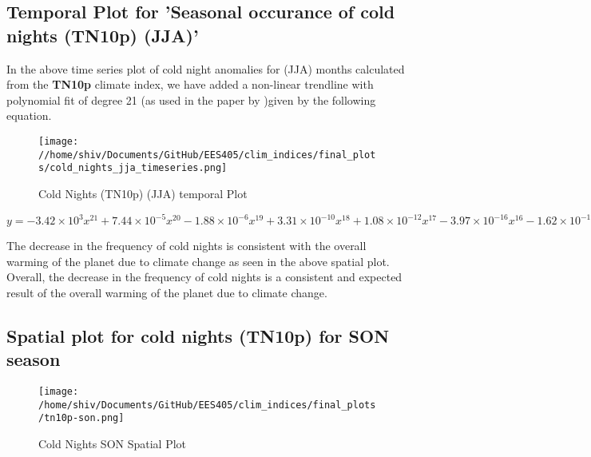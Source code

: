 \documentclass[a4paper, 12pt, twoside]{report}
\begin{document}
\subsection{Temporal Plot for 'Seasonal occurance of cold nights (TN10p) (JJA)'}
In the above time series plot of cold night anomalies for (JJA) months calculated from the \textbf{TN10p} climate index, we have added a non-linear trendline with polynomial fit of degree 21 (as used in the paper by )given by the following equation. \\
\begin{figure}[htb]
    \centering
    \texttt{[image: //home/shiv/Documents/GitHub/EES405/clim\_indices/final\_plots/cold\_nights\_jja\_timeseries.png]}
    \caption{Cold Nights (TN10p) (JJA) temporal Plot}
    \label{fig:tn10p_jja_temporal}
\end{figure}

$ y = -3.42\times10^{3}x^{21}+7.44\times10^{-5}x^{20}-1.88\times10^{-6}x^{19}+3.31\times10^{-10}x^{18}+1.08\times10^{-12}x^{17}-3.97\times10^{-16}x^{16}-1.62\times10^{-19}x^{15}+1.05\times10^{-22}x^{14}-5.80\times10^{-27}x^{13}-8.00\times10^{-30}x^{12}+2.29\times10^{-33}x^{11}-1.20\times10^{-37}x^{10}-6.72\times10^{-41}x^{9}+1.99\times10^{-44}x^{8}-2.95\times10^{-48}x^{7}+2.85\times10^{-52}x^{6}-1.92\times10^{-56}x^{5}+9.12\times10^{-61}x^{4}-3.03\times10^{-65}x^{3}+6.69\times10^{-70}x^{2}-8.87\times10^{-75}x+5.34\times10^{-80}$

The decrease in the frequency of cold nights is consistent with the overall warming of the planet due to climate change as seen in the above spatial plot.\\
Overall, the decrease in the frequency of cold nights is a consistent and expected result of the overall warming of the planet due to climate change.

\subsection{Spatial plot for cold nights (TN10p) for SON season}

\begin{figure}[htb]
    \centering
    \texttt{[image: /home/shiv/Documents/GitHub/EES405/clim\_indices/final\_plots/tn10p-son.png]}
    \caption{Cold Nights SON Spatial Plot}
    \label{fig:tn10p_son_spatial}
\end{figure}
\end{document}
